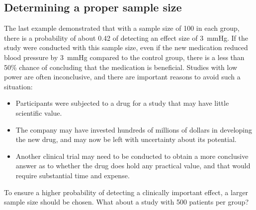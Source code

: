 \subsection{Determining a proper sample size}

The last example demonstrated that with a sample size of 100 in each group, there is a probability of about 0.42 of detecting an effect size of 3~mmHg. If the study were conducted with this sample size, even if the new medication reduced blood pressure by 3~mmHg compared to the control group, there is a less than 50\% chance of concluding that the medication is beneficial. Studies with low power are often inconclusive, and there are important reasons to avoid such a situation:

\begin{itemize}
	\setlength{\itemsep}{0mm}
	\item Participants were subjected to a drug for a study that may have little scientific value. 
	
	\item The company may have invested hundreds of millions of dollars in developing the new drug, and may now be left with uncertainty about its potential. 
	
	\item Another clinical trial may need to be conducted to obtain a more conclusive answer as to whether the drug does hold any practical value, and that would require substantial time and expense. 
\end{itemize}

To ensure a higher probability of detecting a clinically important effect, a larger sample size should be chosen. What about a study with 500 patients per group?


